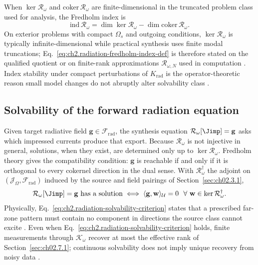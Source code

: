 When $\ker\mathcal{R}_\omega$ and $\mathrm{coker}\,\mathcal{R}_\omega$ are finite-dimensional in the truncated problem class used for analysis, the Fredholm index is
\begin{equation}
\label{eq:ch2.radiation-fredholm-index-def}
\mathrm{ind}\,\mathcal{R}_\omega
=
\dim\ker\mathcal{R}_\omega-\dim\mathrm{coker}\,\mathcal{R}_\omega.
\end{equation}
On exterior problems with compact $\Omega_s$ and outgoing conditions, $\ker\mathcal{R}_\omega$ is typically infinite-dimensional while practical synthesis uses finite modal truncations; Eq.~\eqref{eq:ch2.radiation-fredholm-index-def} is therefore stated on the qualified quotient or on finite-rank approximations $\mathcal{R}_{\omega,N}$ used in computation \cite{stratton1941,harrington2001}. Index stability under compact perturbations of $K_{\mathrm{rad}}$ is the operator-theoretic reason small model changes do not abruptly alter solvability class \cite{stratton1941}.

\subsection{Solvability of the forward radiation equation}
\label{sec:ch02.7c.3}

Given target radiative field $\mathbf{g}\in\mathcal{F}_{\mathrm{rad}}$, the synthesis equation $\mathcal{R}_\omega[\Jimp]=\mathbf{g}$ asks which impressed currents produce that export. Because $\mathcal{R}_\omega$ is not injective in general, solutions, when they exist, are determined only up to $\ker\mathcal{R}_\omega$. Fredholm theory gives the compatibility condition: $\mathbf{g}$ is reachable if and only if it is orthogonal to every cokernel direction in the dual sense. With $\mathcal{R}_\omega^{\dagger}$ the adjoint on $(\mathcal{J}_\Omega,\mathcal{F}_{\mathrm{rad}})$ induced by the source and field pairings of Section~\ref{sec:ch02.3.1},
\begin{equation}
\label{eq:ch2.radiation-solvability-criterion}
\mathcal{R}_\omega[\Jimp]=\mathbf{g}
\ \text{has a solution}
\iff
\langle \mathbf{g},\mathbf{w}\rangle_{\mathcal{U}}=0
\ \ \forall\ \mathbf{w}\in\ker\mathcal{R}_\omega^{\dagger}.
\end{equation}
Physically, Eq.~\eqref{eq:ch2.radiation-solvability-criterion} states that a prescribed far-zone pattern must contain no component in directions the source class cannot excite \cite{stratton1941,devaney2004}. Even when Eq.~\eqref{eq:ch2.radiation-solvability-criterion} holds, finite measurements through $\mathcal{K}_\omega$ recover at most the effective rank of Section~\ref{sec:ch02.7.1}; continuous solvability does not imply unique recovery from noisy data \cite{hansen1988}.

